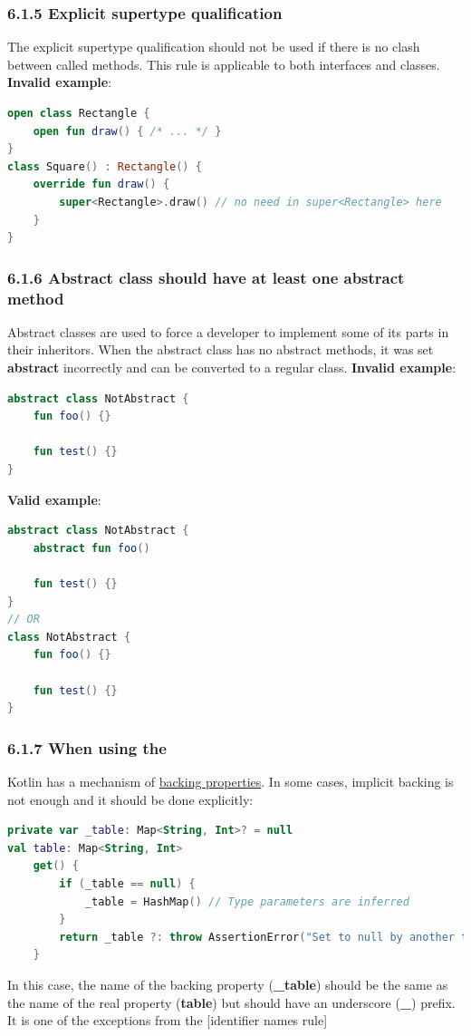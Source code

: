 \subsubsection*{\textbf{6.1.5 Explicit supertype qualification}}
\leavevmode\newline
\label{sec:6.1.5}
The explicit supertype qualification should not be used if there is no clash between called methods. This rule is applicable to both interfaces and classes.
\textbf{Invalid example}:
\begin{lstlisting}[language=Kotlin]
open class Rectangle {
    open fun draw() { /* ... */ }
}
class Square() : Rectangle() {
    override fun draw() {
        super<Rectangle>.draw() // no need in super<Rectangle> here
    }
}
\end{lstlisting}
\subsubsection*{\textbf{6.1.6 Abstract class should have at least one abstract method}}
\leavevmode\newline
\label{sec:6.1.6}
Abstract classes are used to force a developer to implement some of its parts in their inheritors.
When the abstract class has no abstract methods, it was set \textbf{abstract} incorrectly and can be converted to a regular class.
\textbf{Invalid example}:
\begin{lstlisting}[language=Kotlin]
abstract class NotAbstract {
    fun foo() {}
    
    fun test() {}
}
\end{lstlisting}
\textbf{Valid example}:
\begin{lstlisting}[language=Kotlin]
abstract class NotAbstract {
    abstract fun foo()
    
    fun test() {}
}
// OR
class NotAbstract {
    fun foo() {}
    
    fun test() {}
}
\end{lstlisting}
\subsubsection*{\textbf{6.1.7 When using the}}
\leavevmode\newline
\label{sec:6.1.7}
Kotlin has a mechanism of \href{https://kotlinlang.org/docs/reference/properties.html#backing-properties}{backing properties}.
In some cases, implicit backing is not enough and it should be done explicitly:
\begin{lstlisting}[language=Kotlin]
private var _table: Map<String, Int>? = null
val table: Map<String, Int>
    get() {
        if (_table == null) {
            _table = HashMap() // Type parameters are inferred
        }
        return _table ?: throw AssertionError("Set to null by another thread")
    }
\end{lstlisting}
In this case, the name of the backing property (\textbf{\_table}) should be the same as the name of the real property (\textbf{table}) but should have an underscore (\textbf{\_}) prefix.
It is one of the exceptions from the [identifier names rule]
